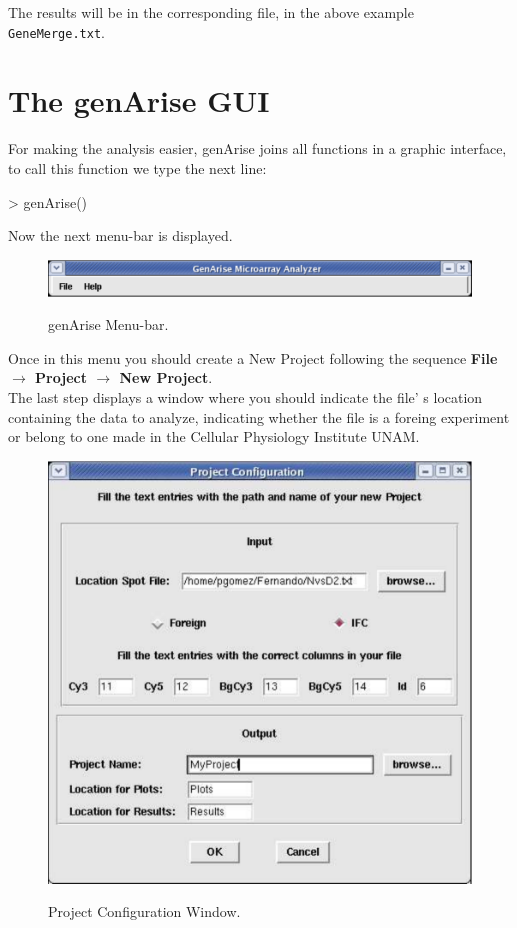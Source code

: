 \documentclass[12pt]{article}
\begin{document}
The results will be in the corresponding file, in the above example \texttt{GeneMerge.txt}.

\section{The genArise GUI}

For making the analysis easier, genArise joins all functions in a graphic interface, to call this function we type the next line:

\begin{Scode}
> genArise()
\end{Scode}

Now the next menu-bar is displayed.
\begin{figure}[h]
\begin{center}
\includegraphics[scale= 0.3]{./images/mainmenu.pdf}\\
\caption{genArise Menu-bar. \label{fig15}}
\end{center}
\end{figure}

Once in this menu you should create a New Project following the sequence  \textbf{File $\rightarrow$ Project $\rightarrow$ New Project}.\\
The last step displays a window where you should indicate the file' s location containing the data to analyze, indicating whether the file is a foreing experiment or belong to one made in the Cellular Physiology Institute UNAM. 
\begin{figure}[h]
\begin{center}
\includegraphics[scale= 0.3]{./images/projectmenufilled.pdf}\\
\caption{Project Configuration Window. \label{fig16}}
\end{center}
\end{figure}
\end{document}
